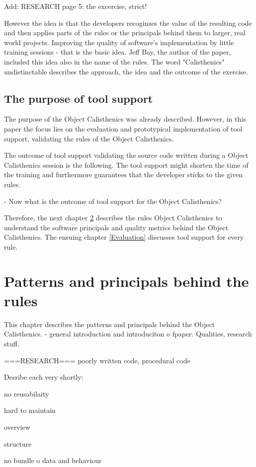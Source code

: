 Add: RESEARCH page 5: the excercise, strict!

However the idea is that the developers recoginzes the value of the resulting code and then applies parts of the rules or the principals behind them to larger, real world projects. 
Improving the quality of software's implementation by little training sessions - that is the basic idea. Jeff Bay, the author of the paper, included this idea also in the name of the rules. The word "Calisthenics" undistinctable describes the approach, the idea and the outcome of the exercise.

\section{The purpose of tool support}
The purpose of the Object Calisthenics was already described. However, in this paper the focus lies on the evaluation and prototypical implementation of tool support, validating the rules of the Object Calisthenics. 

The outcome of tool support validating the source code written during a Object Calisthenics session is the following. The tool support might shorten the time of the training and furthermore guarantees that the developer sticks to the given rules. 

- Now what is the outcome of tool support for the Object Calisthenics?

Therefore, the next chapter  \ref{Description} describes the rules Object Calisthenics to understand the software principals and quality metrics behind the Object Calisthenics. 
The ensuing chapter \ref{Evaluation} discusses tool support for every rule. 

\chapter{Patterns and principals behind the rules}
\label{Description}
This chapter describes the patterns and principals behind the Object Calisthenics. 
- general introduction and introduciton o fpaper. Qualities, research stuff.

===RESEARCH===
poorly written code, procedural code

Desribe each very shortly: 

no reusabilaity

hard to maintain

overview

structure

no bundle o data and behaviour

